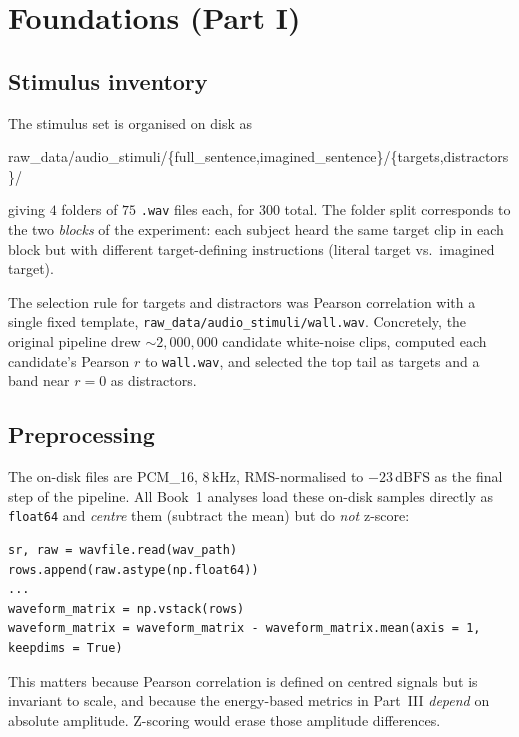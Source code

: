 \documentclass[11pt]{article}
\begin{document}
\section{Foundations (Part I)}

\subsection{Stimulus inventory}
\label{sec:inventory}

The stimulus set is organised on disk as
\begin{center}
\ttfamily
raw\_data/audio\_stimuli/\{full\_sentence,imagined\_sentence\}/\{targets,distractors\}/
\end{center}
giving $4$ folders of $75$ \texttt{.wav} files each, for $300$ total.  The
folder split corresponds to the two \emph{blocks} of the experiment:
each subject heard the same target clip in each block but with different
target-defining instructions (literal target vs.\ imagined target).

The selection rule for targets and distractors was Pearson correlation
with a single fixed template, \texttt{raw\_data/audio\_stimuli/wall.wav}.
Concretely, the original pipeline drew $\sim 2{,}000{,}000$ candidate
white-noise clips, computed each candidate's Pearson $r$ to
\texttt{wall.wav}, and selected the top tail as targets and a band near
$r = 0$ as distractors.

\subsection{Preprocessing}

The on-disk files are PCM\_16, $8\,\mathrm{kHz}$, RMS-normalised to
$-23\,\mathrm{dBFS}$ as the final step of the pipeline.  All Book~1
analyses load these on-disk samples directly as \texttt{float64} and
\emph{centre} them (subtract the mean) but do \emph{not} z-score:

\begin{lstlisting}[caption={Canonical loader (excerpt from \texttt{ch11-non-pearson-metrics.py})}]
sr, raw = wavfile.read(wav_path)
rows.append(raw.astype(np.float64))
...
waveform_matrix = np.vstack(rows)
waveform_matrix = waveform_matrix - waveform_matrix.mean(axis = 1, keepdims = True)
\end{lstlisting}

This matters because Pearson correlation is defined on centred signals
but is invariant to scale, and because the energy-based metrics in
Part~III \emph{depend} on absolute amplitude.  Z-scoring would erase
those amplitude differences.
\end{document}
